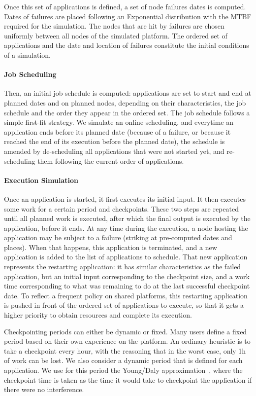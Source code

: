 Once this set of applications is defined, a set of node failures dates
is computed. Dates of failures are placed following an Exponential
distribution with the MTBF required for the simulation. The nodes that
are hit by failures are chosen uniformly between all nodes of the
simulated platform. The ordered set of applications and the date and
location of failures constitute the initial conditions of a simulation.

\paragraph*{Job Scheduling}
Then, an initial job schedule is computed: applications are set to
start and end at planned dates and on planned nodes, depending on
their characteristics, the job schedule and the order they appear in
the ordered set. The job schedule follows a simple first-fit
strategy. We simulate an online scheduling, and everytime an
application ends before its planned date (because of a failure, or
because it reached the end of its execution before the planned date),
the schedule is amended by de-scheduling all applications that were
not started yet, and re-scheduling them following the current order of
applications.

\paragraph*{Execution Simulation}
Once an application is started, it first executes its initial
input. It then executes some work for a certain period and
checkpoints. These two steps are repeated until all planned work is
executed, after which the final output is executed by the application,
before it ends. At any time during the execution, a node hosting the
application may be subject to a failure (striking at pre-computed
dates and places). When that happens, this application is terminated,
and a new application is added to the list of applications to
schedule. That new application represents the restarting application:
it has similar characteristics as the failed application, but an
initial input corresponding to the checkpoint size, and a work time
corresponding to what was remaining to do at the last successful
checkpoint date. To reflect a frequent policy on shared platforms, this
restarting application is pushed in front of the ordered set of
applications to execute, so that it gets a higher priority to obtain
resources and complete its execution.

Checkpointing periods can either be dynamic or fixed. Many users
define a fixed period based on their own experience on the
platform. An ordinary heuristic is to take a checkpoint every hour,
with the reasoning that in the worst case, only 1h of work can be
lost. We also consider a dynamic period that is defined for each
application. We use for this period the Young/Daly
approximation~\cite{young74,daly04}, where the checkpoint time is taken as
the time it would take to checkpoint the application if there were no interference.

